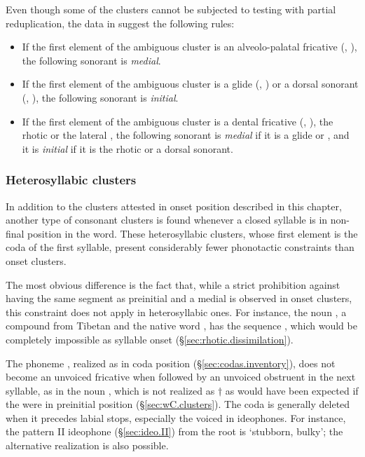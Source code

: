 Even though some of the clusters cannot be subjected to testing with partial reduplication, the data in  suggest the following rules:

\begin{itemize}
	\item If the first element of the ambiguous cluster is an alveolo-palatal fricative  (, ), the following sonorant is \textit{medial}.
	\item If the first element of the ambiguous cluster is a glide  (, ) or a dorsal sonorant (, ), the following sonorant is \textit{initial}.
	\item If the first element of the ambiguous cluster is a dental fricative  (, ), the rhotic  or the lateral , the following sonorant is \textit{medial} if it is a glide or , and it is \textit{initial} if it is the rhotic or a dorsal sonorant. 
\end{itemize}


\subsubsection{Heterosyllabic clusters} \label{sec:heterosyllabic.clusters}  
In addition to the clusters attested in onset position described in this chapter, another type of consonant clusters is found whenever a closed syllable is in non-final position in the word. These heterosyllabic clusters, whose first element is the coda of the first syllable, present considerably fewer phonotactic constraints than onset clusters.


The most obvious difference is the fact that, while a strict prohibition against having the same segment as preinitial and a medial is observed in onset clusters, this constraint does not apply in heterosyllabic ones. For instance, the noun , a compound from Tibetan  and the native word , has the sequence , which would be completely impossible as syllable onset (§\ref{sec:rhotic.dissimilation}).

The phoneme , realized as  in coda position (§\ref{sec:codas.inventory}), does not become an unvoiced fricative when followed by an unvoiced obstruent in the next syllable, as in the noun , which is not realized as $\dagger$ as would have been expected if the  were in preinitial position (§\ref{sec:wC.clusters}). The coda  is generally deleted when it precedes labial stops, especially the voiced  in ideophones. For instance, the pattern II ideophone (§\ref{sec:ideo.II}) from the root   is  `stubborn, bulky'; the alternative realization  is also possible.

